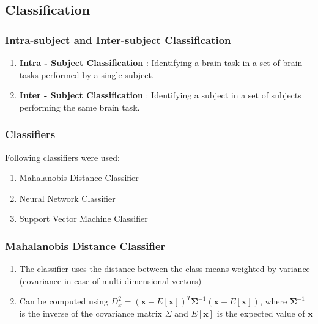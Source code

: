 \documentclass[unknownkeysallowed]{beamer}
\begin{document}
\subsection{Classification}
\begin{frame}
	\frametitle{Intra-subject and Inter-subject Classification}
    \begin{enumerate}
		\item \textbf{Intra - Subject Classification} : Identifying a brain task in a set of brain tasks performed by a single subject.
        \pause
        \item \textbf{Inter - Subject Classification} : Identifying a subject in a set of subjects performing the same brain task.
	\end{enumerate} 
\end{frame}

\begin{frame}
	\frametitle{Classifiers}
    Following classifiers were used:
    \pause
    \begin{enumerate}
    \item Mahalanobis Distance Classifier
    \pause
    \item Neural Network Classifier
	\pause
   	\item Support Vector Machine Classifier
    \end{enumerate}
\end{frame}

\begin{frame}
	\frametitle{Mahalanobis Distance Classifier}
    \begin{enumerate}
    \item The classifier uses the distance between the class means weighted by variance (covariance in case of multi-dimensional vectors)
    \pause
    \item Can be computed using $D^2_x = (\mathbf{x} - E[\mathbf{x}])^T \bm{\Sigma}^{-1} (\mathbf{x} - E[\mathbf{x}])$, where $\bm{\Sigma} ^{-1}$ is the inverse of the covariance matrix $\Sigma$ and $E[\mathbf{x}]$ is the expected value of $\mathbf{x}$
    \end{enumerate}
    
    
\end{frame}
\end{document}
